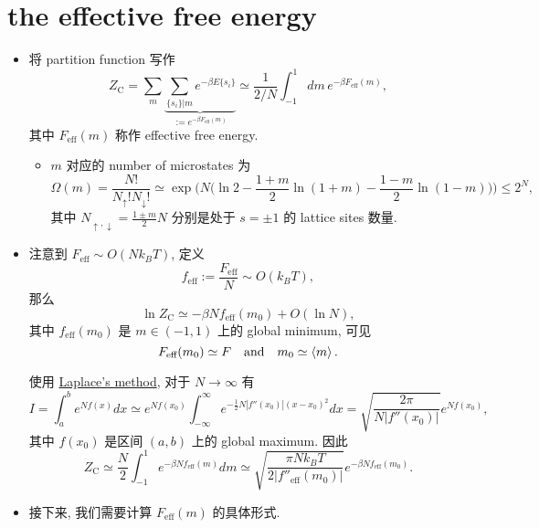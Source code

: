 \section{the effective free energy}
\begin{itemize}
	\item 将 partition function 写作
	\begin{equation}
		Z_\text{C} = \sum_m \underbrace{\sum_{\{s_i\} | m} e^{- \beta E\{s_i\}}}_{:= e^{- \beta F_\text{eff}(m)}} \simeq \frac{1}{2 / N} \int_{- 1}^1 dm \, e^{- \beta F_\text{eff}(m)},
	\end{equation}
	其中 $F_\text{eff}(m)$ 称作 effective free energy.
	\begin{itemize}
		\item $m$ 对应的 number of microstates 为
		\begin{equation}
			\Omega(m) = \frac{N!}{N_\uparrow! N_\downarrow!} \simeq \exp \Big( N \Big( \ln 2 - \frac{1 + m}{2} \ln(1 + m) - \frac{1 - m}{2} \ln(1 - m) \Big) \Big) \leq 2^N,
		\end{equation}
		其中 $N_{\uparrow, \downarrow}  =\frac{1 \pm m}{2} N$ 分别是处于 $s = \pm 1$ 的 lattice sites 数量.
	\end{itemize}
	
	\item 注意到 $F_\text{eff} \sim O(N k_B T)$, 定义
	\begin{equation}
		f_\text{eff} := \frac{F_\text{eff}}{N} \sim O(k_B T),
	\end{equation}
	那么
	\begin{equation}
		\ln Z_\text{C} \simeq - \beta N f_\text{eff}(m_0) + O(\ln N),
	\end{equation}
	其中 $f_\text{eff}(m_0)$ 是 $m \in (- 1, 1)$ 上的 global minimum, 可见
	\begin{equation}
		F_\text{eff}(m_0) \simeq F \quad \text{and} \quad m_0 \simeq \braket{m}.
	\end{equation}
	
	\begin{tcolorbox}[title=proof:]
		使用 \href{https://en.wikipedia.org/wiki/Laplace%27s_method#General_theory}{Laplace's method}, 对于 $N \rightarrow \infty$ 有
		\begin{equation}
			I = \int_a^b e^{N f(x)} dx \simeq e^{N f(x_0)} \int_{- \infty}^\infty e^{- \frac{1}{2} N |f''(x_0)| (x - x_0)^2} dx = \sqrt{\frac{2 \pi}{N |f''(x_0)|}} e^{N f(x_0)},
		\end{equation}
		其中 $f(x_0)$ 是区间 $(a, b)$ 上的 global maximum. 因此
		\begin{equation}
			Z_\text{C} \simeq \frac{N}{2} \int_{- 1}^1 e^{- \beta N f_\text{eff}(m)} dm \simeq \sqrt{\frac{\pi N k_B T}{2 |f''_\text{eff}(m_0)|}} e^{- \beta N f_\text{eff}(m_0)}.
		\end{equation}
	\end{tcolorbox}
	
	\item 接下来, 我们需要计算 $F_\text{eff}(m)$ 的具体形式.
\end{itemize}

